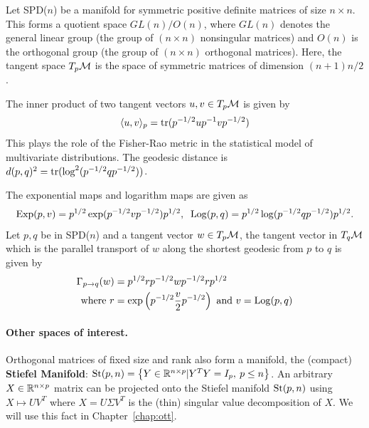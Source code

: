 Let SPD($n$) be a manifold for symmetric positive definite matrices of size $n\times n$.
This forms a quotient space $GL(n)/O(n)$, where
$GL(n)$ denotes the general linear group (the group of $(n \times n)$ nonsingular matrices)
and $O(n)$ is the orthogonal group 
(the group of $(n \times n)$ orthogonal matrices). 
Here, the tangent space $T_{p}\mathcal{M}$ is the space of symmetric matrices of dimension $(n+1)n/2$.

The inner product of two tangent vectors $u,v \in T_{p}\mathcal{M}$ is given by 
\begin{equation}
\begin{split}
  \langle u,v \rangle_{p} = \operatorname{tr}(p^{-1/2}up^{-1}vp^{-1/2})
\end{split}
\label{eq:metricSPD}
\end{equation}
This plays the role of the Fisher-Rao metric in the statistical model of multivariate distributions.
The geodesic distance is $d(p,q)^{2} = \operatorname{tr}( \log^{2}(p^{-1/2}qp^{-1/2}))$.

The exponential maps and logarithm maps are given as 
\begin{equation}
\begin{split}
  \operatorname*{Exp}(p,v) = p^{1/2} \exp(p^{-1/2}vp^{-1/2})p^{1/2}, \;\;
  \operatorname*{Log}(p,q) = p^{1/2} \log(p^{-1/2}qp^{-1/2})p^{1/2}.
\end{split}
\end{equation}
Let $p, q$ be in SPD($n$) and a tangent vector $w \in T_{p}\mathcal{M}$, the
tangent vector in $T_{q}\mathcal{M}$ which is the parallel transport of $w$ along
the shortest geodesic from $p$ to $q$ is given by 
\begin{equation}
\begin{split}
\Gamma_{p \rightarrow q}(w) &= p^{1/2}rp^{-1/2}wp^{-1/2}rp^{1/2} \\
\text{where } r &= \exp \left (p^{-1/2}\frac{v}{2}p^{-1/2} \right ) \text{ and
}v = \operatorname*{Log}(p,q)
\end{split}
\end{equation}

\paragraph{Other spaces of interest.}
Orthogonal matrices of fixed size and rank also form a manifold, the (compact) \textbf{Stiefel Manifold}: $ \text{St}(p,n)=\left\{Y \in \mathbb{R}^{n\times p} | Y^TY=I_p,\: p \leq n\right\}$.
An arbitrary $X \in \mathbb{R}^{n \times p}$ matrix can be projected onto the Stiefel manifold $\text{St}(p,n)$ using $X \mapsto UV^T$ where $X=U\Sigma V^T$ is the (thin) singular value decomposition of $X$. We will use this fact in Chapter~\ref{chap:ott}.